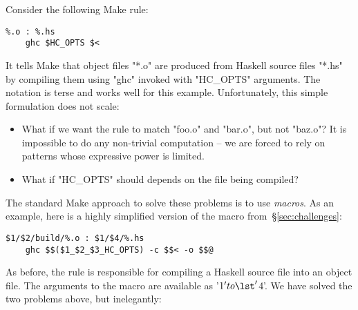 Consider the following Make rule:

\begin{lstlisting}
%.o : %.hs
    ghc $HC_OPTS $<
\end{lstlisting}

\noindent It tells Make that object files \lst"*.o" are produced from Haskell
source files \lst"*.hs" by compiling them using \lst"ghc" invoked with
\lst"HC_OPTS" arguments. The notation is terse and works well for this example.
Unfortunately, this simple formulation does not scale:

\begin{itemize}
\item What if we want the rule to match \lst"foo.o" and \lst"bar.o", but not
\lst"baz.o"? It is impossible to do any non-trivial computation -- we are forced
to rely on patterns whose expressive power is limited.
\item What if \lst"HC_OPTS" should depends on the file being compiled?
\end{itemize}

The standard Make approach to solve these problems is to use \emph{macros}.
As an example, here is a highly simplified version of the macro from~\S\ref{sec:challenges}:

\begin{lstlisting}
$1/$2/build/%.o : $1/$4/%.hs
    ghc $$($1_$2_$3_HC_OPTS) -c $$< -o $$@
\end{lstlisting}

\noindent As before, the rule is responsible for compiling a Haskell source
file into an object file. The arguments to the macro are available as \lst'$1'
to \lst'$4'. We have solved the two problems above, but inelegantly:


